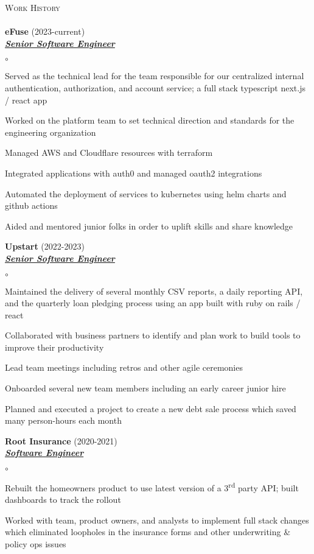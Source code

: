 \documentclass{article}
\newcommand{\lineunder}{\vspace*{-8pt} \\ \hspace*{-18pt} \hrulefill{} \\}
\newcommand{\header}[1]{{\hspace*{-15pt}\vspace*{6pt} \textsc{#1}} \vspace*{-6pt} \lineunder}
\newcommand{\employer}[3]{{ \textbf{#1} (#2)\\ \underline{\textbf{\emph{#3}}}\\  }}
\newenvironment{achievements}{\begin{list}{$\circ$}{\topsep 0pt \itemsep -2pt}}{\vspace*{4pt}\end{list}}
\newcommand{\ts}{\textsuperscript}
\begin{document}
\header{Work History}
\employer{eFuse}{2023-current}{Senior Software Engineer}
	\begin{achievements}
	\item Served as the technical lead for the team responsible for our centralized internal authentication, authorization, and account service; a full stack typescript next.js / react app
	\item Worked on the platform team to set technical direction and standards for the engineering organization
	\item Managed AWS and Cloudflare resources with terraform
	\item Integrated applications with auth0 and managed oauth2 integrations
	\item Automated the deployment of services to kubernetes using helm charts and github actions
	\item Aided and mentored junior folks in order to uplift skills and share knowledge
	\end{achievements}
\employer{Upstart}{2022-2023}{Senior Software Engineer}
	\begin{achievements}
	\item Maintained the delivery of several monthly CSV reports, a daily reporting API, and the quarterly loan pledging process using an app built with ruby on rails / react
	\item Collaborated with business partners to identify and plan work to build tools to improve their productivity
	\item Lead team meetings including retros and other agile ceremonies
	\item Onboarded several new team members including an early career junior hire
	\item Planned and executed a project to create a new debt sale process which saved many person-hours each month
	\end{achievements}
\employer{Root Insurance}{2020-2021}{Software Engineer}
	\begin{achievements}
	\item Rebuilt the homeowners product to use latest version of a 3\ts{rd} party API; built dashboards to track the rollout
	\item Worked with team, product owners, and analysts to implement full stack changes which eliminated loopholes in the insurance forms and other underwriting \& policy ops issues
	\end{achievements}
\end{document}
